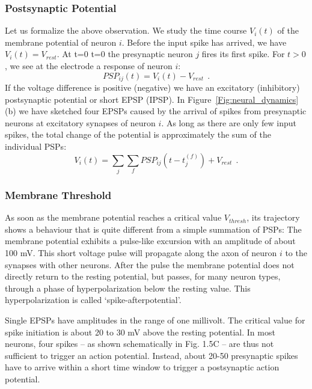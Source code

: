 %
\subsubsection{Postsynaptic Potential}
Let us formalize the above observation. We study the time course $V_i(t)$ of the membrane potential of neuron $i$. 
Before the input spike has arrived, we have $V_i(t) = V_{rest}$. At t=0 t=0 the presynaptic neuron $j$ fires its first spike. For $t>0$, we see at the electrode a response of neuron $i$:
\begin{equation}
PSP_{ij}(t) = V_i(t) - V_{rest}~~.
\end{equation}
If the voltage difference is positive (negative) we have an excitatory (inhibitory) postsynaptic potential or short EPSP (IPSP). In Figure~\ref{Fig:neural_dynamics}(b) we have sketched four EPSPs caused by the arrival of spikes from presynaptic neurons at excitatory synapses of neuron $i$.
As long as there are only few input spikes, the total change of the potential is approximately the sum of the individual PSPs:
\begin{equation}
V_i(t) = \sum_j\sum_f PSP_{ij}(t-t_j^{(f)}) + V_{rest}~~.
\end{equation}

\subsubsection{Membrane Threshold}

As soon as the membrane potential reaches a critical value $V_{thresh}$, its trajectory shows a behaviour that is quite different from a simple summation of PSPs: The membrane potential exhibits a pulse-like excursion with an amplitude of about 100 mV. This short voltage pulse will propagate along the axon of neuron $i$ to the synapses with other neurons. After the pulse the membrane potential does not directly return to the resting potential, but passes, for many neuron types, through a phase of hyperpolarization below the resting value. This hyperpolarization is called ‘spike-afterpotential’.

Single EPSPs have amplitudes in the range of one millivolt. The critical value for spike initiation is about 20 to 30 mV above the resting potential. In most neurons, four spikes – as shown schematically in Fig. 1.5C – are thus not sufficient to trigger an action potential. Instead, about 20-50 presynaptic spikes have to arrive within a short time window to trigger a postsynaptic action potential.

